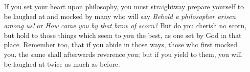 If you set your heart upon philosophy, you must straightway prepare yourself to
be laughed at and mocked by many who will say \emph{Behold a philosopher arisen
among us!} or \emph{How came you by that  brow of scorn?} But do you cherish no
scorn, but hold to  those things which seem to you the best,  as one set by God
in that place. Remember  too, that if you abide in those  ways, those who first
mocked you, the same shall afterwards reverence  you; but if you yield to them,
you will be laughed at twice as much as before.
